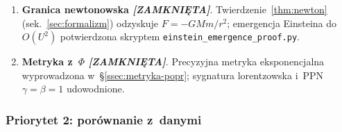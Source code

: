 \begin{enumerate}[label=\textbf{O\arabic*}., nosep]
  \item \textbf{Granica newtonowska
        \emph{[ZAMKNI\k{E}TA]}}.
        Twierdzenie~\ref{thm:newton} (sek.~\ref{sec:formalizm})
        odzyskuje $F = -GMm/r^2$; emergencja Einsteina do
        $O(U^2)$ potwierdzona skryptem
        \texttt{einstein\_emergence\_proof.py}.

  \item \textbf{Metryka z~$\Phi$
        \emph{[ZAMKNI\k{E}TA]}}.
        Precyzyjna metryka eksponencjalna wyprowadzona
        w~\S\ref{ssec:metryka-popr}; sygnatura lorentzowska
        i~PPN $\gamma=\beta=1$ udowodnione.
\end{enumerate}

\subsubsection{Priorytet 2: por\'ownanie z~danymi}

